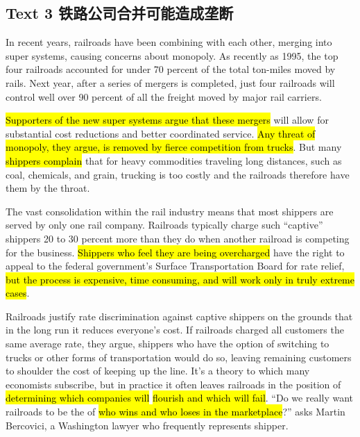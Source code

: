 \subsection{Text 3 铁路公司合并可能造成垄断}
In recent years, railroads have been combining with each other, merging into super systems, causing 
 concerns about monopoly. As recently as 1995, the top four railroads accounted for under 70 percent of the total ton-miles moved by rails. Next year, after a series of mergers is completed, just four railroads will control well over 90 percent of all the 
freight moved by major rail carriers.

\hl{Supporters of the new super systems argue that these mergers} will allow for 
substantial cost reductions and better 
coordinated service. 
\hl{Any threat of monopoly, they argue, is removed by fierce competition from trucks}. But many \hl{shippers complain} that for heavy 
 commodities traveling long distances, such as coal, chemicals, and grain, trucking is too costly and the railroads therefore 
have them by the throat.

The vast 
consolidation within the rail industry means that most shippers are served by only one rail company. Railroads typically charge such “captive” shippers 20 to 30 percent more than they do when another railroad is competing for the business. 
\hl{Shippers who feel they are being overcharged} have the right to appeal to the federal government’s Surface Transportation Board for rate relief, \hl{but the process is expensive, time consuming, and will work only in truly extreme cases}.

Railroads justify rate discrimination against captive shippers on the grounds that in the long run it reduces everyone’s cost. 
If railroads charged all customers the same average rate, they argue, shippers who have the option of switching to trucks or other forms of transportation would do so, 
leaving remaining customers to shoulder the cost of keeping up the line. It’s a theory to which many economists 
subscribe, but in practice it often leaves railroads in the position of \hl{determining which companies will }
\hl{flourish and which will fail}. “Do we really want railroads to be the 
 of \hl{who wins and who loses in the marketplace}?” asks Martin Bercovici, a Washington lawyer who frequently represents shipper.


